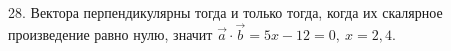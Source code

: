 28. Вектора перпендикулярны тогда и только тогда, когда их скалярное произведение равно нулю, значит $\vec{a}\cdot\vec{b}=5x-12=0,\ x=2,4.$\\
